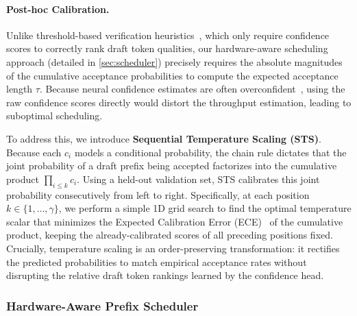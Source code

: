   
\paragraph{Post-hoc Calibration.}  
Unlike threshold-based verification heuristics~\citep{huang2024specdec++,li-etal-2024-eagle,zhang2026pacer}, which only require confidence scores to correctly rank draft token qualities, our hardware-aware scheduling approach (detailed in \autoref{sec:scheduler}) precisely requires the absolute magnitudes of the cumulative acceptance probabilities to compute the expected acceptance length $\tau$. Because neural confidence estimates are often overconfident~\citep{guo2017calibration,ovadia2019can}, using the raw confidence scores directly would distort the throughput estimation, leading to suboptimal scheduling.  
  
To address this, we introduce \textbf{Sequential Temperature Scaling (STS)}. Because each $c_i$ models a conditional probability, the chain rule dictates that the joint probability of a draft prefix being accepted factorizes into the cumulative product $\prod_{i \leq k} c_i$. Using a held-out validation set, STS calibrates this joint probability consecutively from left to right. Specifically, at each position $k \in \{1,\dots,\gamma\}$, we perform a simple 1D grid search to find the optimal temperature scalar that minimizes the Expected Calibration Error (ECE)~\citep{naeini2015obtaining} of the cumulative product, keeping the already-calibrated scores of all preceding positions fixed. Crucially, temperature scaling is an order-preserving transformation: it rectifies the predicted probabilities to match empirical acceptance rates without disrupting the relative draft token rankings learned by the confidence head.

\subsubsection{Hardware-Aware Prefix Scheduler}  
\label{sec:scheduler}

